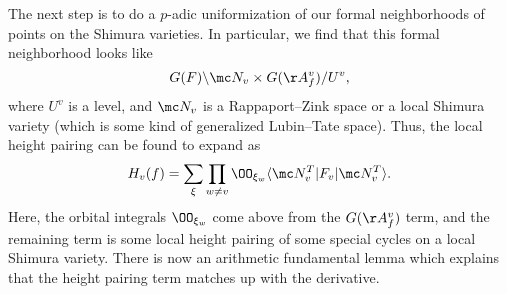 \documentclass[../notes.tex]{subfiles}
\begin{document}
The next step is to do a $p$-adic uniformization of our formal neighborhoods of points on the Shimura varieties. In particular, we find that this formal neighborhood looks like
\[G(F)\backslash\mc N_v\times G(\AA_f^v)/U^v,\]
where $U^v$ is a level, and $\mc N_v$ is a Rappaport--Zink space or a local Shimura variety (which is some kind of generalized Lubin--Tate space). Thus, the local height pairing can be found to expand as
\[H_v(f)=\sum_\xi\prod_{w\ne v}\OO_{\xi_w}\langle\mc N^T_v|F_v|\mc N^T_v\rangle.\]
Here, the orbital integrals $\OO_{\xi_w}$ come above from the $G(\AA_f^v)$ term, and the remaining term is some local height pairing of some special cycles on a local Shimura variety. There is now an arithmetic fundamental lemma which explains that the height pairing term matches up with the derivative.
\end{document}
